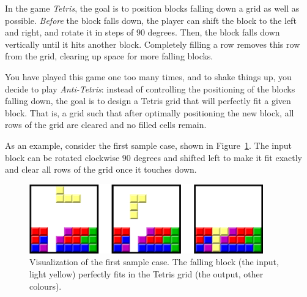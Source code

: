 

\newcommand{\maxhwIn}{100}
\newcommand{\maxhwOut}{1000}

In the game \emph{Tetris},
the goal is to position blocks falling down a grid as well as possible.
\emph{Before} the block falls down, the player can shift the block to the left and
right, and rotate it in steps of $90$ degrees.
Then, the block falls down vertically until it hits another block.
Completely filling a row removes this row from the grid, clearing up space for more falling blocks.

You have played this game one too many times, and to shake things up, you decide to play \emph{Anti-Tetris}:
instead of controlling the positioning of the blocks falling down,
the goal is to design a Tetris grid that will perfectly fit a given block. That
is, a grid such that after optimally positioning the new block, all rows of the grid
are cleared and no filled cells remain.

As an example, consider the first sample case, shown in Figure~\ref{fig:tetris}.
The input block can be rotated clockwise $90$ degrees and shifted left to
make it fit exactly and clear all rows of the grid once it touches down.

\begin{figure}[h]
    \centering
    \includegraphics[width=0.9\textwidth]{tetris-sample-1.drawio.pdf}
    \caption{
        Visualization of the first sample case.
        The falling block (the input, light yellow) perfectly fits in the Tetris grid (the output, other colours).
    }
    \label{fig:tetris}
\end{figure}

